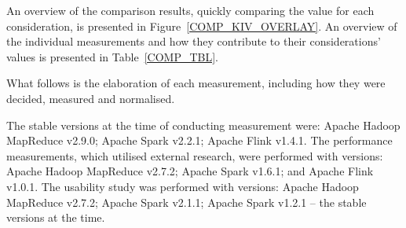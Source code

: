   An overview of the comparison results, quickly comparing the value for each consideration, is presented in Figure~\ref{COMP_KIV_OVERLAY}. An overview of the individual measurements and how they contribute to their considerations' values is presented in Table~\ref{COMP_TBL}.

  What follows is the elaboration of each measurement, including how they were decided, measured and normalised.

  The stable versions at the time of conducting measurement were: Apache Hadoop MapReduce v2.9.0; Apache Spark v2.2.1; Apache Flink v1.4.1. The performance measurements, which utilised external research, were performed with versions: Apache Hadoop MapReduce v2.7.2; Apache Spark v1.6.1; and Apache Flink v1.0.1. The usability study was performed with versions: Apache Hadoop MapReduce v2.7.2; Apache Spark v2.1.1; Apache Spark v1.2.1 -- the stable versions at the time.

